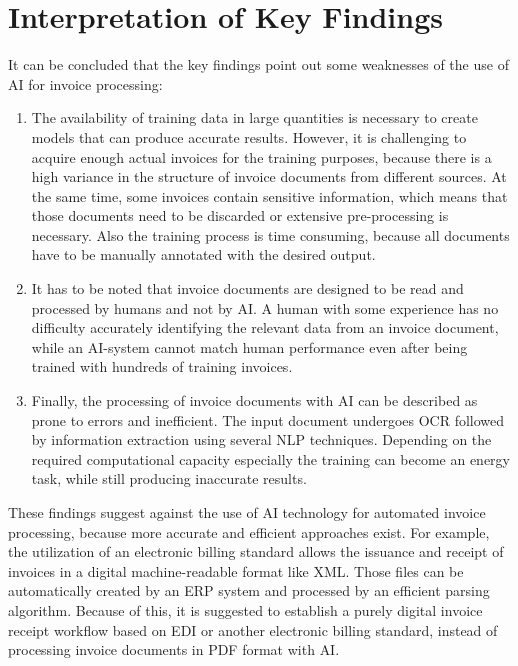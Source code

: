 \newpage
\section{Interpretation of Key Findings}
It can be concluded that the key findings point out some weaknesses of the use of \acl{AI} for invoice processing:
\begin{enumerate}
    \item The availability of training data in large quantities is necessary to create models that can produce accurate results. However, it is challenging to acquire enough actual invoices for the training purposes, because there is a high variance in the structure of invoice documents from different sources. At the same time, some invoices contain sensitive information, which means that those documents need to be discarded or extensive pre-processing is necessary. Also the training process is time consuming, because all documents have to be manually annotated with the desired output.
    \item It has to be noted that invoice documents are designed to be read and processed by humans and not by \ac{AI}. A human with some experience has no difficulty accurately identifying the relevant data from an invoice document, while an \ac{AI}-system cannot match human performance even after being trained with hundreds of training invoices.
    \item Finally, the processing of invoice documents with \ac{AI} can be described as prone to errors and inefficient. The input document undergoes \ac{OCR} followed by information extraction using several \ac{NLP} techniques. Depending on the required computational capacity especially the training can become an energy task, while still producing inaccurate results.
\end{enumerate}
These findings suggest against the use of \ac{AI} technology for automated invoice processing, because more accurate and efficient approaches exist. For example, the utilization of an electronic billing standard allows the issuance and receipt of invoices in a digital machine-readable format like XML. Those files can be automatically created by an \ac{ERP} system and processed by an efficient parsing algorithm.
Because of this, it is suggested to establish a purely digital invoice receipt workflow based on \ac{EDI} or another electronic billing standard, instead of processing invoice documents in PDF format with \ac{AI}.